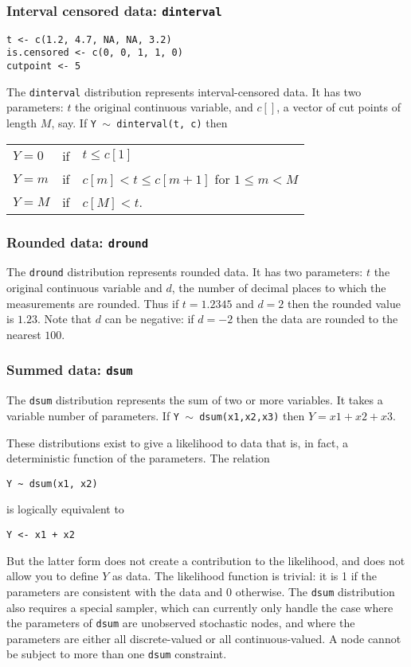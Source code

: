 \documentclass[11pt, a4paper, titlepage]{report}
\begin{document}
\subsubsection{Interval censored data: \texttt{dinterval}}

\begin{verbatim}
t <- c(1.2, 4.7, NA, NA, 3.2)
is.censored <- c(0, 0, 1, 1, 0)
cutpoint <- 5
\end{verbatim}

The \texttt{dinterval} distribution represents interval-censored
data. It has two parameters: $t$ the original continuous variable, and
$c[]$, a vector of cut points of length $M$, say. If \texttt{Y $\sim$
  dinterval(t, c)} then

\begin{tabular}{lll}
$Y=0$   & if & $t \leq c[1]$\\
$Y=m$   & if & $c[m] < t \leq c[m+1]$ for $1 \leq m < M$\\
$Y = M$ & if & $c[M] < t$.
\end{tabular}

\subsubsection{Rounded data: \texttt{dround}}

The \texttt{dround} distribution represents rounded data. It has two
parameters: $t$ the original continuous variable and $d$, the number
of decimal places to which the measurements are rounded. Thus if
$t=1.2345$ and $d=2$ then the rounded value is $1.23$. Note that $d$
can be negative: if $d=-2$ then the data are rounded to the nearest
$100$.

\subsubsection{Summed data: \texttt{dsum}}

The \texttt{dsum} distribution represents the sum of two or more
variables.  It takes a variable number of parameters. If \texttt{Y $\sim$
dsum(x1,x2,x3)} then $Y=x1+x2+x3$.

These distributions exist to give a likelihood to data that is, in fact,
a deterministic function of the parameters.  The relation
\begin{verbatim}
Y ~ dsum(x1, x2)
\end{verbatim}
is logically equivalent to
\begin{verbatim}
Y <- x1 + x2
\end{verbatim}
But the latter form does not create a contribution to the likelihood,
and does not allow you to define $Y$ as data.  The likelihood function
is trivial: it is 1 if the parameters are consistent with the data and
0 otherwise.  The \texttt{dsum} distribution also requires a special
sampler, which can currently only handle the case where the parameters
of \texttt{dsum} are unobserved stochastic nodes, and where the
parameters are either all discrete-valued or all continuous-valued. A node
cannot be subject to more than one \texttt{dsum} constraint.
\end{document}
